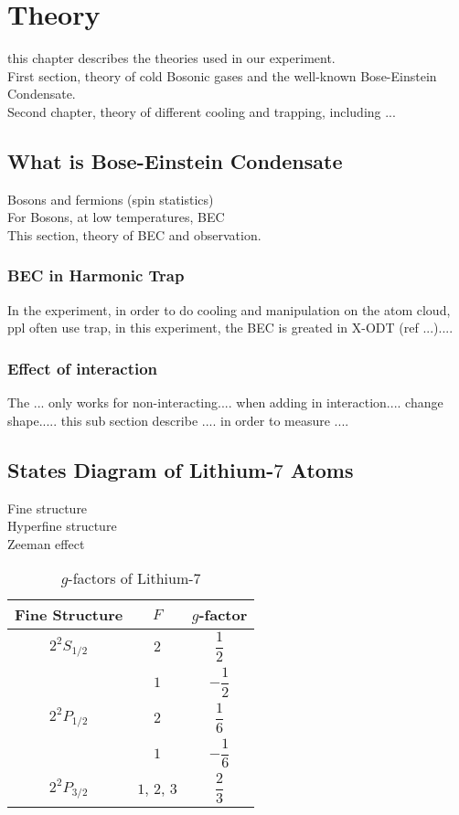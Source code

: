 \chapter{Theory}
this chapter describes the theories used in our experiment.\\
First section, theory of cold Bosonic gases and the well-known Bose-Einstein Condensate.\\
Second chapter, theory of different cooling and trapping, including ...\\

\section{What is Bose-Einstein Condensate}\label{ch1:bec}

Bosons and fermions (spin statistics\cite{spin-statistics1,spin-statistics2})\\
For Bosons, at low temperatures, BEC\\
This section, theory of BEC and observation.

\subsection{BEC in Harmonic Trap}

In the experiment, in order to do cooling and manipulation on the atom cloud, ppl often use trap, in this experiment, the BEC is greated in X-ODT (ref ...)....

\subsection{Effect of interaction}

The ... only works for non-interacting.... when adding in interaction.... change shape..... this sub section describe .... in order to measure ....

\section{States Diagram of Lithium-$7$ Atoms}

Fine structure\\
Hyperfine structure\\
Zeeman effect

\begin{table}
\caption{$g$-factors of Lithium-$7$}
\label{li7:g-factors}
\begin{center}
\begin{tabular}{|c|c|c|}\hline
Fine Structure & $F$ & $g$-factor \\\hline
$2^2S_{1/2}$ & $2$ & $\dfrac 12$ \\\cline{2-3}
 & $1$ & $-\dfrac 12$ \\\hline
$2^2P_{1/2}$ & $2$ & $\dfrac 16$ \\\cline{2-3}
 & $1$ & $-\dfrac 16$ \\\hline
$2^2P_{3/2}$ & $1$, $2$, $3$ & $\dfrac 23$ \\\hline
\end{tabular}
\end{center}
\end{table}

